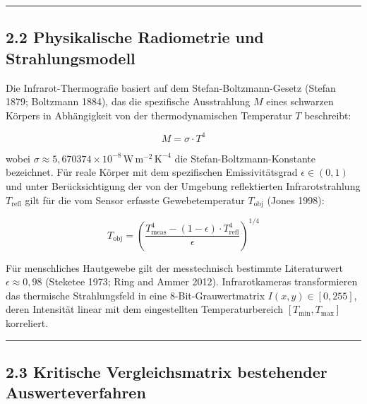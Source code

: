 \documentclass[
  11pt,
]{article}
\begin{document}
\begin{center}\rule{0.5\linewidth}{0.5pt}\end{center}

\subsection{2.2 Physikalische Radiometrie und
Strahlungsmodell}\label{physikalische-radiometrie-und-strahlungsmodell}

Die Infrarot-Thermografie basiert auf dem Stefan-Boltzmann-Gesetz
(Stefan 1879; Boltzmann 1884), das die spezifische Ausstrahlung \(M\)
eines schwarzen Körpers in Abhängigkeit von der thermodynamischen
Temperatur \(T\) beschreibt:

\[ M = \sigma \cdot T^4 \]

wobei
\(\sigma \approx 5{,}670374 \times 10^{-8}\,\text{W}\,\text{m}^{-2}\,\text{K}^{-4}\)
die Stefan-Boltzmann-Konstante bezeichnet. Für reale Körper mit dem
spezifischen Emissivitätsgrad \(\epsilon \in (0, 1)\) und unter
Berücksichtigung der von der Umgebung reflektierten Infrarotstrahlung
\(T_{\text{refl}}\) gilt für die vom Sensor erfasste Gewebetemperatur
\(T_{\text{obj}}\) (Jones 1998):

\[ T_{\text{obj}} = \left( \frac{T_{\text{meas}}^4 - (1 - \epsilon) \cdot T_{\text{refl}}^4}{\epsilon} \right)^{1/4} \]

Für menschliches Hautgewebe gilt der messtechnisch bestimmte
Literaturwert \(\epsilon \approx 0{,}98\) (Steketee 1973; Ring and Ammer
2012). Infrarotkameras transformieren das thermische Strahlungsfeld in
eine 8-Bit-Grauwertmatrix \(I(x,y) \in [0, 255]\), deren Intensität
linear mit dem eingestellten Temperaturbereich \([T_{\min}, T_{\max}]\)
korreliert.

\begin{center}\rule{0.5\linewidth}{0.5pt}\end{center}

\subsection{2.3 Kritische Vergleichsmatrix bestehender
Auswerteverfahren}\label{kritische-vergleichsmatrix-bestehender-auswerteverfahren}
\end{document}
